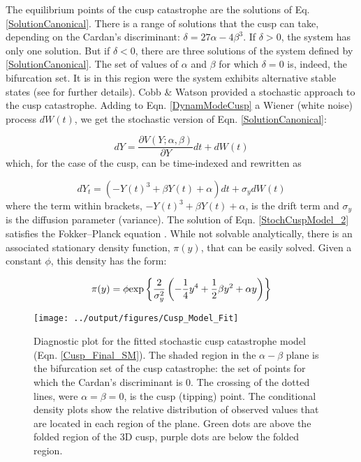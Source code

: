 \documentclass[11pt]{article}
\begin{document}
{The equilibrium points of the cusp catastrophe are the solutions of Eq. \ref{SolutionCanonical}. There is a range of solutions that the cusp can take, depending on the Cardan's discriminant: $ \delta = 27\alpha - 4\beta^3 $. If $ \delta > 0 $, the system has only one solution. But if $ \delta < 0 $, there are three solutions of the system defined by \ref{SolutionCanonical}. The set of values of $ \alpha $ and $ \beta $ for which $ \delta = 0 $ is, indeed, the bifurcation set. It is in this region were the system exhibits alternative stable states (see \cite{Thom1975,Poston1979,Casti1979,Grasman2009} for further details). Cobb \& Watson \cite{Cobb1980} provided a stochastic approach to the cusp catastrophe. Adding to Eqn. \ref{DynamModeCusp} a Wiener (white noise) process $ dW(t) $, we get the stochastic version of Eqn. \ref{SolutionCanonical}:

\begin{equation}\label{StochCuspModel_1}
	dY = \dfrac{\partial V(Y; \alpha,\beta)}{\partial Y}dt + dW(t)
\end{equation}
which, for the case of the cusp, can be time-indexed and rewritten as

\begin{equation}\label{StochCuspModel_2}
	dY_{t} = (-Y(t)^3 + \beta Y(t) + \alpha)dt + \sigma_{y} dW(t)
\end{equation}
where the term within brackets, $-Y(t)^3 + \beta Y(t) + \alpha $, is the drift term and $ \sigma_{y} $ is the diffusion parameter (variance). The solution of Eqn. \ref{StochCuspModel_2} satisfies the Fokker–Planck equation \cite{Zeeman1988}. While not solvable analytically, there is an associated stationary density function, $\pi (y)$, that can be easily solved. Given a constant $\phi$, this density has the form:

\begin{equation}\label{CuspStatDensity}
	\pi (y) = \phi \text{exp} \left\{ \frac{2}{\sigma_{y}^2} \left(-\frac{1}{4} y^4 + \frac{1}{2}\beta y^2 + \alpha y \large\right)\right\}
\end{equation}

\renewcommand{\thefigure}{S4}
\begin{figure}[t]
	\centering
	\texttt{[image: ../output/figures/Cusp\_Model\_Fit]}
	\caption[Diagnostic plot for the fitted stochastic cusp catastrophe model]{Diagnostic plot for the fitted stochastic cusp catastrophe model (Eqn. \ref{Cusp_Final_SM}). The shaded region in the  $ \alpha-\beta $ plane is the bifurcation set of the cusp catastrophe: the set of points for which the Cardan's discriminant is 0. The crossing of the dotted lines, were $ \alpha = \beta = 0 $, is the cusp (tipping) point. The conditional density plots show the relative distribution of observed values that are located in each region of the plane. Green dots are above the folded region of the 3D cusp, purple dots are below the folded region.}
	\label{fig:Cusp_Model_Fit}
\end{figure}

}
\end{document}
